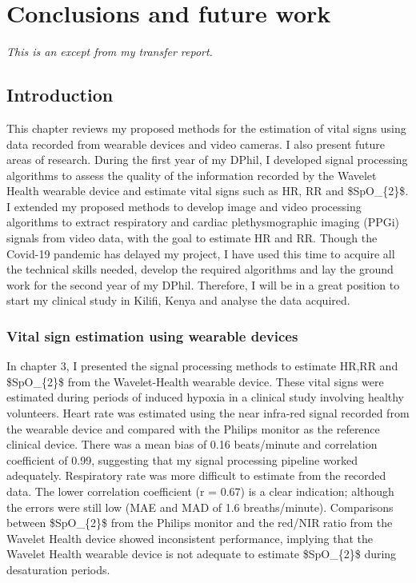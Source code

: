 
\chapter{Conclusions and future work}

\textit{This is an except from my transfer report.}

\section{Introduction}

This chapter reviews my proposed methods for the estimation of vital signs using data recorded from wearable devices and video cameras. I also present future areas of research. During the first year of my DPhil, I developed signal processing algorithms to assess the quality of the information recorded by the Wavelet Health wearable device and estimate vital signs such as HR, RR and \gls{$SpO_{2}$}. I extended my proposed methods to develop image and video processing algorithms to extract respiratory and cardiac  plethysmographic imaging (PPGi) signals from video data, with the goal to estimate HR and RR. Though the Covid-19 pandemic has delayed my project, I have used this time to acquire all the technical skills needed, develop the required algorithms and lay the ground work for the second year of my DPhil. Therefore, I will be in a great position to start my clinical study in Kilifi, Kenya and analyse the data acquired.

\subsection{Vital sign estimation using wearable devices}

 In chapter 3, I presented the signal processing methods to estimate HR,RR and  \gls{$SpO_{2}$}  from the Wavelet-Health wearable device. These vital signs were estimated during periods of induced hypoxia in a clinical study involving healthy volunteers. Heart rate was estimated using the near infra-red signal recorded from the wearable device and compared with the Philips monitor as the reference clinical device. There was a mean bias of 0.16 beats/minute and correlation coefficient of 0.99, suggesting that my signal processing pipeline worked adequately. Respiratory rate was more difficult to estimate from the recorded data. The lower correlation coefficient (r = 0.67) is a clear indication; although the errors were still low (MAE and MAD of 1.6 breaths/minute). Comparisons between \gls{$SpO_{2}$} from the Philips monitor and the red/NIR ratio from the Wavelet Health device showed inconsistent performance, implying that the Wavelet Health wearable device is not adequate to estimate  \gls{$SpO_{2}$} during desaturation periods.
 
